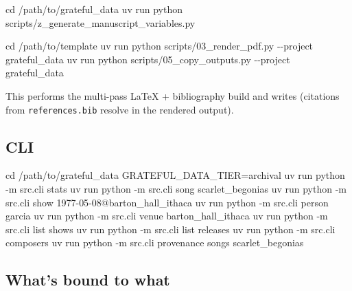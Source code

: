 \documentclass[
]{article}
\newenvironment{Shaded}{}{}
\newcommand{\AttributeTok}[1]{\textcolor[rgb]{0.49,0.56,0.16}{#1}}
\newcommand{\BuiltInTok}[1]{\textcolor[rgb]{0.00,0.50,0.00}{#1}}
\newcommand{\ExtensionTok}[1]{#1}
\newcommand{\NormalTok}[1]{#1}
\newcommand{\OperatorTok}[1]{\textcolor[rgb]{0.40,0.40,0.40}{#1}}
\newcommand{\VariableTok}[1]{\textcolor[rgb]{0.10,0.09,0.49}{#1}}
\begin{document}
\begin{Shaded}
\begin{Highlighting}[]
\BuiltInTok{cd}\NormalTok{ /path/to/grateful\_data}
\ExtensionTok{uv}\NormalTok{ run python scripts/z\_generate\_manuscript\_variables.py}

\BuiltInTok{cd}\NormalTok{ /path/to/template}
\ExtensionTok{uv}\NormalTok{ run python scripts/03\_render\_pdf.py }\AttributeTok{{-}{-}project}\NormalTok{ grateful\_data}
\ExtensionTok{uv}\NormalTok{ run python scripts/05\_copy\_outputs.py }\AttributeTok{{-}{-}project}\NormalTok{ grateful\_data}
\end{Highlighting}
\end{Shaded}

This performs the multi-pass LaTeX + bibliography build and writes
(citations from \texttt{references.bib} resolve in the rendered output).

\subsection{CLI}\label{cli}

\begin{Shaded}
\begin{Highlighting}[]
\BuiltInTok{cd}\NormalTok{ /path/to/grateful\_data}
\VariableTok{GRATEFUL\_DATA\_TIER}\OperatorTok{=}\NormalTok{archival }\ExtensionTok{uv}\NormalTok{ run python }\AttributeTok{{-}m}\NormalTok{ src.cli stats}
\ExtensionTok{uv}\NormalTok{ run python }\AttributeTok{{-}m}\NormalTok{ src.cli song scarlet\_begonias}
\ExtensionTok{uv}\NormalTok{ run python }\AttributeTok{{-}m}\NormalTok{ src.cli show 1977{-}05{-}08@barton\_hall\_ithaca}
\ExtensionTok{uv}\NormalTok{ run python }\AttributeTok{{-}m}\NormalTok{ src.cli person garcia}
\ExtensionTok{uv}\NormalTok{ run python }\AttributeTok{{-}m}\NormalTok{ src.cli venue barton\_hall\_ithaca}
\ExtensionTok{uv}\NormalTok{ run python }\AttributeTok{{-}m}\NormalTok{ src.cli list shows}
\ExtensionTok{uv}\NormalTok{ run python }\AttributeTok{{-}m}\NormalTok{ src.cli list releases}
\ExtensionTok{uv}\NormalTok{ run python }\AttributeTok{{-}m}\NormalTok{ src.cli composers}
\ExtensionTok{uv}\NormalTok{ run python }\AttributeTok{{-}m}\NormalTok{ src.cli provenance songs scarlet\_begonias}
\end{Highlighting}
\end{Shaded}

\subsection{What's bound to what}\label{whats-bound-to-what}
\end{document}
